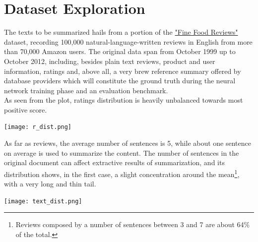 \documentclass[fleqn,10pt]{SelfArx} %
\affiliation{\textsuperscript{*}\textit{Universita` degli Studi di Milano Bicocca, CdLM in Data Science}}
\begin{document}
\flushbottom %

\maketitle %

\tableofcontents %

\thispagestyle{empty} %


\section{Dataset Exploration} 
The texts to be summarized hails from a portion of the \href{https://www.kaggle.com/snap/amazon-fine-food-reviews}{"Fine Food Reviews"} dataset, recording 100,000 natural-language-written reviews in English from more than 70,000 Amazon users. The original data span from October 1999 up to October 2012, including, besides plain text reviews, product and user information, ratings and, above all, a very brew reference summary offered by database providers which will constitute the ground truth during the neural network training phase and an evaluation benchmark.\\
As seen from the plot, ratings distribution is heavily unbalanced towards most positive score.
\par
{\centering\vspace{10pt}
\texttt{[image: r\_dist.png]}
\vspace{10pt}
\par}
As far as reviews, the average number of sentences is 5, while about one sentence on average is used to summarize the content. The number of sentences in the original document can affect extractive results of summarization, and its distribution shows, in the first case, a slight concentration around the mean\footnote{Reviews composed by a number of sentences between 3 and 7 are about 64\% of the total.}, with a very long and thin tail.\par
{\centering\vspace{10pt}
\texttt{[image: text\_dist.png]}
\vspace{10pt}
\par}
\end{document}
